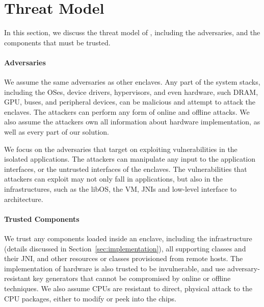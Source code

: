 \section{Threat Model}
\label{sec:threat}

In this section, we discuss the threat model of \sysname{},
including the adversaries,
and the components that must be trusted.

\paragraph{Adversaries}
We assume the same adversaries as other \sgx{} enclaves.
Any part of the system stacks, including the OSes,
device drivers, hypervisors, and even hardware,
such DRAM, GPU, buses, and peripheral devices, can be malicious
and attempt to attack the enclaves.
The attackers can perform any form of
online and offline attacks.
We also assume the attackers own all information
about \sgx{} hardware implementation, as well as every part of our solution.

We focus on the adversaries that target on
exploiting vulnerabilities in the isolated applications.
The attackers can manipulate any input to the application interfaces,
or the untrusted interfaces of the enclaves.
The vulnerabilities that attackers can exploit may not only fall in applications, but also in the infrastructures,
such as the libOS, the \java{} VM, JNIs and low-level interface to architecture.


\paragraph{Trusted Components}
We trust any components loaded inside an enclave,
including the infrastructure (details discussed in Section~\ref{sec:implementation}), %
all supporting classes and their JNI,
and other resources or classes provisioned from remote hosts.
The implementation of \sgx{} hardware is also trusted to be invulnerable,
and use adversary-resistant key generators that cannot be compromised
by online or offline techniques.
We also assume \intel{} CPUs are resistant to direct, physical attack to the CPU packages, either to modify or peek into the chips.

